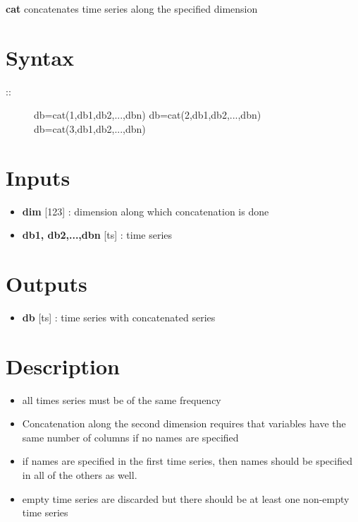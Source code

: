 \documentclass[letterpaper,10pt,english]{sphinxmanual}
\begin{document}
\label{classes/time_series/@ts/ts:cat}
\textbf{cat} concatenates time series along the specified dimension


\section{Syntax}
\label{classes/time_series/@ts/ts:id98}\begin{description}
\item[{::}] \leavevmode
db=cat(1,db1,db2,...,dbn)
db=cat(2,db1,db2,...,dbn)
db=cat(3,db1,db2,...,dbn)

\end{description}


\section{Inputs}
\label{classes/time_series/@ts/ts:id99}\begin{itemize}
\item {} 
\textbf{dim} {[}1\textbar{}2\textbar{}3{]} : dimension along which concatenation is done

\item {} 
\textbf{db1, db2,...,dbn} {[}ts{]} : time series

\end{itemize}


\section{Outputs}
\label{classes/time_series/@ts/ts:id100}\begin{itemize}
\item {} 
\textbf{db} {[}ts{]} : time series with concatenated series

\end{itemize}


\section{Description}
\label{classes/time_series/@ts/ts:id101}\begin{itemize}
\item {} 
all times series must be of the same frequency

\item {} 
Concatenation along the second dimension requires that variables have
the same number of columns if no names are specified

\item {} 
if names are specified in the first time series, then names should be
specified in all of the others as well.

\item {} 
empty time series are discarded but there should be at least one
non-empty time series

\end{itemize}
\end{document}
